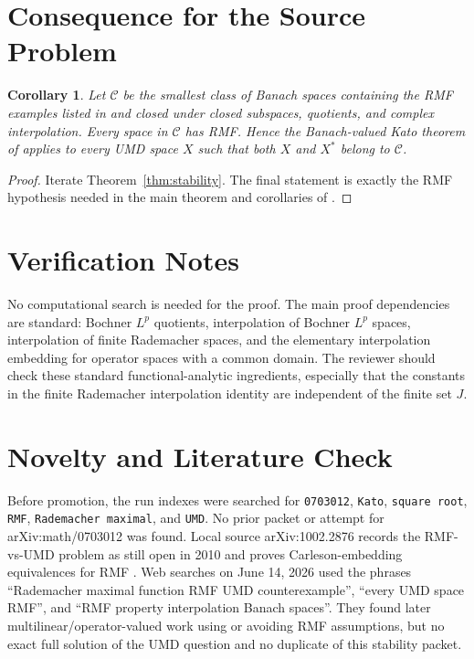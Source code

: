 \documentclass[11pt]{article}
\newtheorem{corollary}{Corollary}
\begin{document}
\section*{Consequence for the Source Problem}

\begin{corollary}
Let \(\mathcal C\) be the smallest class of Banach spaces containing the RMF examples listed in \cite{HMP} and closed under closed subspaces, quotients, and complex interpolation.  Every space in \(\mathcal C\) has RMF.  Hence the Banach-valued Kato theorem of \cite{HMP} applies to every UMD space \(X\) such that both \(X\) and \(X^*\) belong to \(\mathcal C\).
\end{corollary}

\begin{proof}
Iterate Theorem~\ref{thm:stability}.  The final statement is exactly the RMF hypothesis needed in the main theorem and corollaries of \cite{HMP}.
\end{proof}

\section*{Verification Notes}

No computational search is needed for the proof.  The main proof dependencies are standard: Bochner \(L^p\) quotients, interpolation of Bochner \(L^p\) spaces, interpolation of finite Rademacher spaces, and the elementary interpolation embedding for operator spaces with a common domain.  The reviewer should check these standard functional-analytic ingredients, especially that the constants in the finite Rademacher interpolation identity are independent of the finite set \(J\).

\section*{Novelty and Literature Check}

Before promotion, the run indexes were searched for \texttt{0703012}, \texttt{Kato}, \texttt{square root}, \texttt{RMF}, \texttt{Rademacher maximal}, and \texttt{UMD}.  No prior packet or attempt for arXiv:math/0703012 was found.  Local source arXiv:1002.2876 records the RMF-vs-UMD problem as still open in 2010 and proves Carleson-embedding equivalences for RMF \cite{HK}.  Web searches on June 14, 2026 used the phrases ``Rademacher maximal function RMF UMD counterexample'', ``every UMD space RMF'', and ``RMF property interpolation Banach spaces''.  They found later multilinear/operator-valued work using or avoiding RMF assumptions, but no exact full solution of the UMD question and no duplicate of this stability packet.
\end{document}
